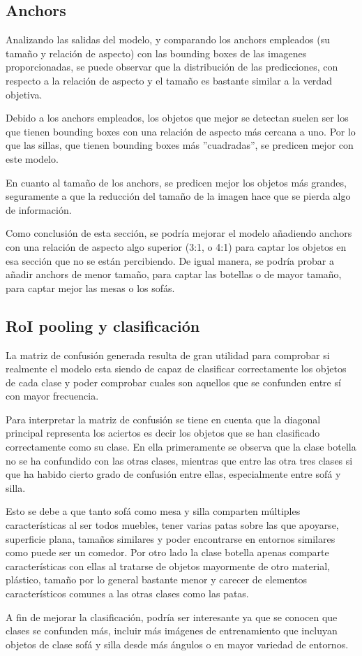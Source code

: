\subsection{Anchors}

    Analizando las salidas del modelo, y comparando los anchors empleados 
    (su tamaño y relación de aspecto) con las bounding boxes de las imagenes proporcionadas, 
    se puede observar que la distribución de las predicciones, con respecto a la relación de aspecto 
    y el tamaño es bastante similar a la verdad objetiva.

    Debido a los anchors empleados, los objetos que mejor se detectan suelen ser 
    los que tienen bounding boxes con una relación de aspecto más cercana a uno. 
    Por lo que las sillas, que tienen bounding boxes más ''cuadradas'', se predicen mejor con este modelo.

    En cuanto al tamaño de los anchors, se predicen mejor los objetos más grandes, 
    seguramente a que la reducción del tamaño de la imagen hace que se pierda algo de información.

    Como conclusión de esta sección, se podría mejorar el modelo añadiendo 
    anchors con una relación de aspecto algo superior (3:1, o 4:1) para captar 
    los objetos en esa sección que no se están percibiendo. De igual manera, 
    se podría probar a añadir anchors de menor tamaño, para captar las botellas o de 
    mayor tamaño, para captar mejor las mesas o los sofás.

\subsection {RoI pooling y clasificación}



    La matriz de confusión generada resulta de gran utilidad para comprobar si realmente el modelo esta siendo de capaz de clasificar correctamente los objetos de cada clase y poder comprobar cuales son aquellos que se confunden entre sí con mayor frecuencia.
    
    Para interpretar la matriz de confusión se tiene en cuenta que la diagonal principal representa los aciertos es decir los objetos que se han clasificado correctamente como su clase. En ella primeramente se observa que la clase botella no se ha confundido con las otras clases, mientras que entre las otra tres clases si que ha habido cierto grado de confusión entre ellas, especialmente entre sofá y silla.
    
    Esto se debe a que tanto sofá como mesa y silla comparten múltiples características al ser todos muebles, tener varias patas sobre las que apoyarse, superficie plana, tamaños similares y poder encontrarse en entornos similares como puede ser un comedor. Por otro lado la clase botella apenas comparte características con ellas al tratarse de objetos mayormente de otro material, plástico, tamaño por lo general bastante menor y carecer de elementos característicos comunes a las otras clases como las patas.
    
    A fin de mejorar la clasificación, podría ser interesante ya que se conocen que clases se confunden más, incluir más imágenes de entrenamiento que incluyan objetos de clase sofá y silla desde más ángulos o en mayor variedad de entornos.
